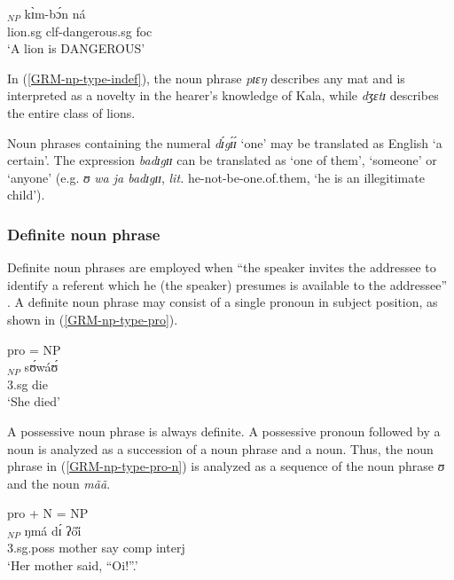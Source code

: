 \begin{exe}
\begin{exe}
\begin{exe}
{\ex\label{GRM-np-indef-2}
\gll  [dʒɛ̀tɪ̀]$_{NP}$ kɪ̀m-bɔ́n  ná \\
  {lion.{\sc sg}} {\sc clf}-dangerous.{\sc sg} {\sc foc} \\
\glt  `A lion is DANGEROUS'



\z 
 \z

In (\ref{GRM-np-type-indef}),  the noun phrase {\it  pɪɛŋ}  describes any mat
and
is interpreted as a novelty in the hearer's knowledge of Kala, while
{\it dʒɛtɪ} describes the entire class of lions. 

Noun phrases  containing the
numeral {\it dɪ́gɪ́ɪ́} `one'  may be translated as
English `a certain'.    The
expression {\it badɪgɪɪ} can be translated as `one of them', `someone' or
`anyone'  (e.g. {\it ʊ wa ja badɪgɪɪ}, {\it lit.} he-not-be-one.of.them, `he is
an
illegitimate child'). 



\subsubsection{Definite noun phrase}
\label{sec:GRM-np-def}

Definite noun phrases are employed when ``the speaker invites the addressee to
identify a referent which he (the speaker) presumes is available to the
addressee'' \citep[184]{Dik97}. A definite noun phrase may consist of  a single
pronoun in subject position, as
shown in (\ref{GRM-np-type-pro}).

\begin{exe}
 \ex\label{GRM-np-type-pro}{\rm pro = NP}\\
\gll  [ʊ̀]$_{NP}$  sʊ́wáʊ́ \\
      {\sc 3.sg} die\\
\glt  `She died'
\z


A possessive noun phrase is always definite. A possessive pronoun followed by a
noun is analyzed as a succession of a noun phrase and a noun. Thus,  the noun
phrase in (\ref{GRM-np-type-pro-n})  is analyzed as a sequence of the noun
phrase {\it ʊ} and the  noun  {\it mãã}. 


\begin{exe}

 \ex\label{GRM-np-type-pro-n}{\rm pro + N = NP}\\
\gll   [ʊ̀ mã̀ã̀]$_{NP}$ ŋmá dɪ́ ʔői̋ \\
      {\sc 3.sg.poss} mother say  {\sc comp} {\sc interj}\\
\glt  `Her mother said, ``Oi!''.'
\z



\end{exe}
\end{exe}}
\end{exe}
\end{exe}
\end{exe}
